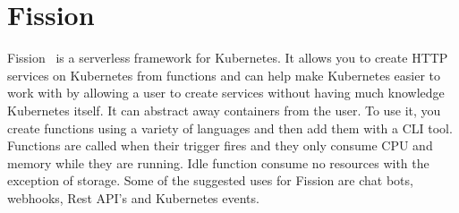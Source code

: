 \section{Fission}
Fission~\cite{hid-sp18-521-FissionBlog} is a serverless framework for
Kubernetes. It allows you to create HTTP services on Kubernetes from
functions and can help make Kubernetes easier to work with by
allowing a user to create services without having much knowledge
Kubernetes itself. It can abstract away containers from the user. 
To use it, you create functions using a variety of languages and then
add them with a CLI tool. Functions are called when their trigger fires and 
they only consume CPU and memory while they are running. Idle function 
consume no resources with the exception of storage. Some of the suggested
uses for Fission are chat bots, webhooks, Rest API's and Kubernetes events.
